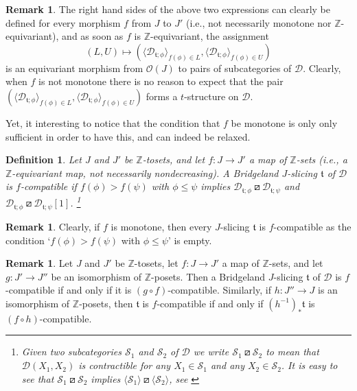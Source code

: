 \documentclass{article}
\newtheorem{defn}[thm]{Definition}
\theoremstyle{definition}
\newtheorem{rem}[thm]{Remark}
\newcommand{\Z}{\mathbb{Z}}
\newcommand{\tee}{\mathfrak{t}}
\newcommand{\orth}{\boxslash}
\begin{document}
\begin{rem}
The right hand sides of the above two expressions can clearly be defined for every morphism $f$ from $J$ to $J'$ (i.e., not necessarily monotone nor $\Z$-equivariant), and as soon as $f$ is $\Z$-equivariant, the assignment
\[
(L,U)\mapsto (\langle \mathscr{D}_{\tee;\phi}\rangle_{f(\phi)\in L},\langle \mathscr{D}_{\tee;\phi}\rangle_{f(\phi)\in U})
\]
is an equivariant morphism from $\mathcal{O}(J)$ to pairs of subcategories of $\mathscr{D}$. Clearly, when $f$ is not monotone there is no reason to expect that the pair $(\langle \mathscr{D}_{\tee;\phi}\rangle_{f(\phi)\in L},\langle \mathscr{D}_{\tee;\phi}\rangle_{f(\phi)\in U})$ forms a $t$-structure on $\mathscr{D}$.
\end{rem}
Yet, it interesting to notice that the condition that $f$ be monotone is only only sufficient in order to have this, and can indeed be relaxed.\\




\begin{defn}\label{compatible}
Let $J$ and $J'$ be $\Z$-tosets, and let $f\colon J\to J'$ a map of $\Z$-sets (i.e., a $\Z$-equivariant map, not necessarily nondecreasing). A Bridgeland $J$-slicing $\tee$ of $\mathscr{D}$ is \emph{$f$-compatible}
if $f(\phi)>f(\psi)$ with $\phi\leq \psi$ implies $\mathscr{D}_{\tee; \phi}\orth \mathscr{D}_{\tee;\psi}$ and $\mathscr{D}_{\tee; \phi}\orth \mathscr{D}_{\tee;\psi}[1]$.
\footnote{Given two subcategories $\mathscr{S}_1$ and $\mathscr{S}_2$ of $\mathscr{D}$ we write $\mathscr{S}_1\orth \mathscr{S}_2$ to mean that $\mathscr{D}(X_1,X_2)$ is contractible for any $X_1\in \mathscr{S}_1$ and any $X_2\in\mathscr{S}_2$. It is easy to see that $\mathscr{S}_1\orth \mathscr{S}_2$ implies $\langle\mathscr{S}_1\rangle\orth \langle\mathscr{S}_2\rangle$, see \cite[Lemma 4.21]{articolo-con-fosco}}
\end{defn}

\begin{rem}\label{everything-compatible}
Clearly, if $f$ is monotone, then every $J$-slicing $\tee$ is $f$-compatible as the condition `$f(\phi)>f(\psi)$ with $\phi\leq \psi$' is empty.
\end{rem}

\begin{rem}\label{avanti-e-indietro}
Let $J$ and $J'$ be $\Z$-tosets, let $f\colon J\to J'$ a map of $\Z$-sets, and let $g\colon J'\to J''$ be an isomorphism of $\Z$-posets. Then a Bridgeland $J$-slicing $\tee$ of $\mathscr{D}$ is $f$-compatible if and only if it is $(g\circ f)$-compatible. Similarly, if $h\colon J''\to J$ is an isomorphism of $\Z$-posets, then $\tee$ is $f$-compatible if and only if $(h^{-1})_*\tee$ is $(f\circ h)$-compatible.
\end{rem}
\end{document}
